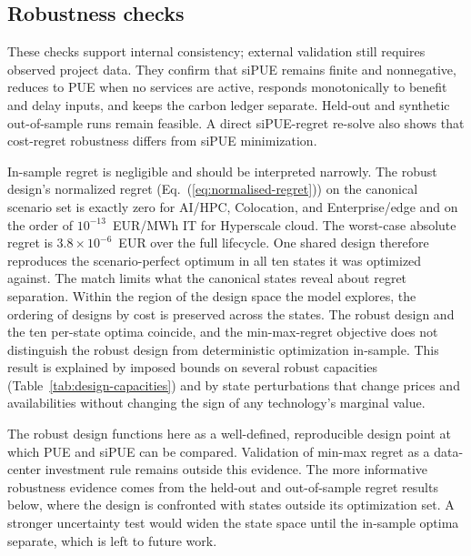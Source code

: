 \documentclass[preprint,12pt]{elsarticle}
\begin{document}
\subsection{Robustness checks}
\label{sec:robustness-checks}

These checks support internal consistency; external validation still requires observed project data. They confirm that siPUE remains finite and nonnegative, reduces to PUE when no services are active, responds monotonically to benefit and delay inputs, and keeps the carbon ledger separate. Held-out and synthetic out-of-sample runs remain feasible. A direct siPUE-regret re-solve also shows that cost-regret robustness differs from siPUE minimization.

In-sample regret is negligible and should be interpreted narrowly. The robust design's normalized regret (Eq.~(\ref{eq:normalised-regret})) on the canonical scenario set is exactly zero for AI/HPC, Colocation, and Enterprise/edge and on the order of $10^{-13}$~EUR/MWh IT for Hyperscale cloud. The worst-case absolute regret is $3.8\times10^{-6}$~EUR over the full lifecycle. One shared design therefore reproduces the scenario-perfect optimum in all ten states it was optimized against. The match limits what the canonical states reveal about regret separation. Within the region of the design space the model explores, the ordering of designs by cost is preserved across the states. The robust design and the ten per-state optima coincide, and the min-max-regret objective does not distinguish the robust design from deterministic optimization in-sample. This result is explained by imposed bounds on several robust capacities (Table~\ref{tab:design-capacities}) and by state perturbations that change prices and availabilities without changing the sign of any technology's marginal value.

The robust design functions here as a well-defined, reproducible design point at which PUE and siPUE can be compared. Validation of min-max regret as a data-center investment rule remains outside this evidence. The more informative robustness evidence comes from the held-out and out-of-sample regret results below, where the design is confronted with states outside its optimization set. A stronger uncertainty test would widen the state space until the in-sample optima separate, which is left to future work.
\end{document}
